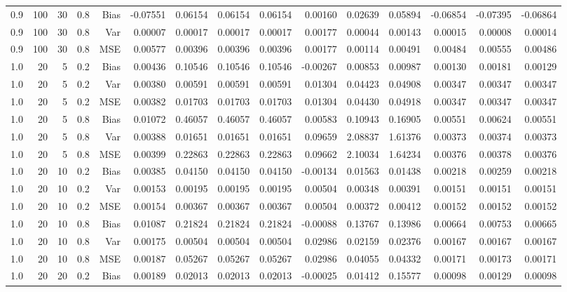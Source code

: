 \begin{table}[!htbp]
\begin{tabular}{lrrrrrrrrrrrrrr}
0.9 & 100 & 30 & 0.8 & Bias & -0.07551 & 0.06154 & 0.06154 & 0.06154 & 0.00160 & 0.02639 & 0.05894 & -0.06854 & -0.07395 & -0.06864 \\
0.9 & 100 & 30 & 0.8 & Var & 0.00007 & 0.00017 & 0.00017 & 0.00017 & 0.00177 & 0.00044 & 0.00143 & 0.00015 & 0.00008 & 0.00014 \\
0.9 & 100 & 30 & 0.8 & MSE & 0.00577 & 0.00396 & 0.00396 & 0.00396 & 0.00177 & 0.00114 & 0.00491 & 0.00484 & 0.00555 & 0.00486 \\
1.0 &  20 &  5 & 0.2 & Bias & 0.00436 & 0.10546 & 0.10546 & 0.10546 & -0.00267 & 0.00853 & 0.00987 & 0.00130 & 0.00181 & 0.00129 \\
1.0 &  20 &  5 & 0.2 & Var & 0.00380 & 0.00591 & 0.00591 & 0.00591 & 0.01304 & 0.04423 & 0.04908 & 0.00347 & 0.00347 & 0.00347 \\
1.0 &  20 &  5 & 0.2 & MSE & 0.00382 & 0.01703 & 0.01703 & 0.01703 & 0.01304 & 0.04430 & 0.04918 & 0.00347 & 0.00347 & 0.00347 \\
1.0 &  20 &  5 & 0.8 & Bias & 0.01072 & 0.46057 & 0.46057 & 0.46057 & 0.00583 & 0.10943 & 0.16905 & 0.00551 & 0.00624 & 0.00551 \\
1.0 &  20 &  5 & 0.8 & Var & 0.00388 & 0.01651 & 0.01651 & 0.01651 & 0.09659 & 2.08837 & 1.61376 & 0.00373 & 0.00374 & 0.00373 \\
1.0 &  20 &  5 & 0.8 & MSE & 0.00399 & 0.22863 & 0.22863 & 0.22863 & 0.09662 & 2.10034 & 1.64234 & 0.00376 & 0.00378 & 0.00376 \\
1.0 &  20 & 10 & 0.2 & Bias & 0.00385 & 0.04150 & 0.04150 & 0.04150 & -0.00134 & 0.01563 & 0.01438 & 0.00218 & 0.00259 & 0.00218 \\
1.0 &  20 & 10 & 0.2 & Var & 0.00153 & 0.00195 & 0.00195 & 0.00195 & 0.00504 & 0.00348 & 0.00391 & 0.00151 & 0.00151 & 0.00151 \\
1.0 &  20 & 10 & 0.2 & MSE & 0.00154 & 0.00367 & 0.00367 & 0.00367 & 0.00504 & 0.00372 & 0.00412 & 0.00152 & 0.00152 & 0.00152 \\
1.0 &  20 & 10 & 0.8 & Bias & 0.01087 & 0.21824 & 0.21824 & 0.21824 & -0.00088 & 0.13767 & 0.13986 & 0.00664 & 0.00753 & 0.00665 \\
1.0 &  20 & 10 & 0.8 & Var & 0.00175 & 0.00504 & 0.00504 & 0.00504 & 0.02986 & 0.02159 & 0.02376 & 0.00167 & 0.00167 & 0.00167 \\
1.0 &  20 & 10 & 0.8 & MSE & 0.00187 & 0.05267 & 0.05267 & 0.05267 & 0.02986 & 0.04055 & 0.04332 & 0.00171 & 0.00173 & 0.00171 \\
1.0 &  20 & 20 & 0.2 & Bias & 0.00189 & 0.02013 & 0.02013 & 0.02013 & -0.00025 & 0.01412 & 0.15577 & 0.00098 & 0.00129 & 0.00098 \\

\end{tabular}
\end{table}
